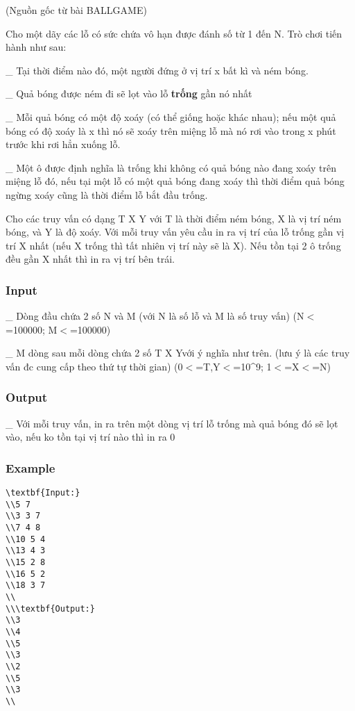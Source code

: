 



   (Nguồn gốc từ bài BALLGAME)  

   Cho một dãy các lỗ có sức chứa vô hạn được đánh số từ 1 đến N. Trò chơi tiến hành như sau:  

   \_ Tại thời điểm nào đó, một người đứng ở vị trí x bất kì và ném bóng.  

   \_ Quả bóng được ném đi sẽ lọt vào lỗ   \textbf{    trống   }   gần nó nhất  

   \_ Mỗi quả bóng có một độ xoáy (có thể giống hoặc khác nhau); nếu một quả bóng có độ xoáy là x thì nó sẽ xoáy trên miệng lỗ mà nó rơi vào trong x phút trước khi rơi hẳn xuống lỗ.  

   \_ Một ô được định nghĩa là trống khi không có quả bóng nào đang xoáy trên miệng lỗ đó, nếu tại một lỗ có một quả bóng đang xoáy thì thời điểm quả bóng ngừng xoáy cũng là thời điểm lỗ bắt đầu trống.  

   Cho các truy vấn có dạng T X Y với T là thời điểm ném bóng, X là vị trí ném bóng, và Y là độ xoáy. Với mỗi truy vấn yêu cầu in ra vị trí của lỗ trống gần vị trí X nhất (nếu X trống thì tất nhiên vị trí này sẽ là X). Nếu tồn tại 2 ô trống đều gần X nhất thì in ra vị trí bên trái.  

\subsubsection{   Input  }

   \_ Dòng đầu chứa 2 số N và M (với N là số lỗ và M là số truy vấn) (N$<$=100000; M$<$=100000)  

   \_ M dòng sau mỗi dòng chứa 2 số T X Yvới ý nghĩa như trên. (lưu ý là các truy vấn đc cung cấp theo thứ tự thời gian) (0$<$=T,Y$<$=10\textasciicircum9; 1$<$=X$<$=N)  

\subsubsection{   Output  }

   \_ Với mỗi truy vấn, in ra trên một dòng vị trí lỗ trống mà quả bóng đó sẽ lọt vào, nếu ko tồn tại vị trí nào thì in ra 0  

\subsubsection{   Example  }
\begin{verbatim}
\textbf{Input:}
\\5 7
\\3 3 7
\\7 4 8
\\10 5 4
\\13 4 3
\\15 2 8
\\16 5 2
\\18 3 7
\\
\\\textbf{Output:}
\\3
\\4
\\5
\\3
\\2
\\5
\\3
\\\end{verbatim}